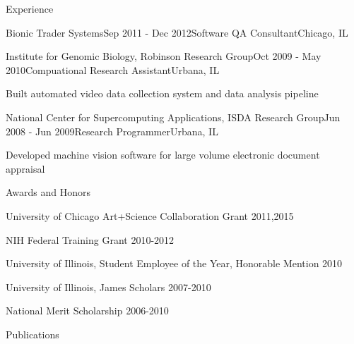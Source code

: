 \documentclass{resume} %
\begin{document}
\begin{rSection}{Experience}
\begin{rSubsection}{Bionic Trader Systems}{Sep 2011 - Dec 2012}{Software QA Consultant}{Chicago, IL}
\end{rSubsection}


\begin{rSubsection}{Institute for Genomic Biology, Robinson Research Group}{Oct 2009 - May 2010}{Compuational Research Assistant}{Urbana, IL}
\item Built automated video data collection system and data analysis pipeline

\end{rSubsection}


\begin{rSubsection}{National Center for Supercomputing Applications, ISDA Research Group}{Jun 2008 - Jun 2009}{Research Programmer}{Urbana, IL}
\item Developed machine vision software for large volume electronic document appraisal

\end{rSubsection}




\end{rSection}


\begin{rSection}{Awards and Honors}
	
	\item University of Chicago Art+Science Collaboration Grant 2011,2015
	\item NIH Federal Training Grant 2010-2012
	\item University of Illinois, Student Employee of the Year, Honorable Mention 2010
	\item University of Illinois, James Scholars 2007-2010
	\item National Merit Scholarship 2006-2010
	
\end{rSection}



\begin{rSection}{Publications}
	\nocite{*}
	

\end{rSection}
\end{document}
